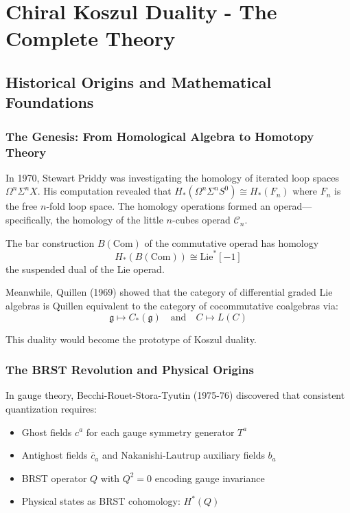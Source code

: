 \section{Chiral Koszul Duality - The Complete Theory}


\subsection{Historical Origins and Mathematical Foundations}

\subsubsection{The Genesis: From Homological Algebra to Homotopy Theory}

In 1970, Stewart Priddy was investigating the homology of iterated loop spaces $\Omega^n\Sigma^n X$. His computation revealed that $H_*(\Omega^n\Sigma^n S^0) \cong H_*(F_n)$ where $F_n$ is the free $n$-fold loop space. The homology operations formed an operad—specifically, the homology of the little $n$-cubes operad $\mathcal{C}_n$.

\begin{theorem}
The bar construction $B(\text{Com})$ of the commutative operad has homology 
$$H_*(B(\text{Com})) \cong \text{Lie}^*[-1]$$
the suspended dual of the Lie operad.
\end{theorem}

Meanwhile, Quillen (1969) showed that the category of differential graded Lie algebras is Quillen equivalent to the category of cocommutative coalgebras via:
$$\mathfrak{g} \mapsto C_*(\mathfrak{g}) \quad \text{and} \quad C \mapsto L(C)$$

This duality would become the prototype of Koszul duality.

\subsubsection{The BRST Revolution and Physical Origins}

In gauge theory, Becchi-Rouet-Stora-Tyutin (1975-76) discovered that consistent quantization requires:
\begin{itemize}
\item Ghost fields $c^a$ for each gauge symmetry generator $T^a$
\item Antighost fields $\bar{c}_a$ and Nakanishi-Lautrup auxiliary fields $b_a$
\item BRST operator $Q$ with $Q^2 = 0$ encoding gauge invariance
\item Physical states as BRST cohomology: $H^*(Q)$
\end{itemize}

